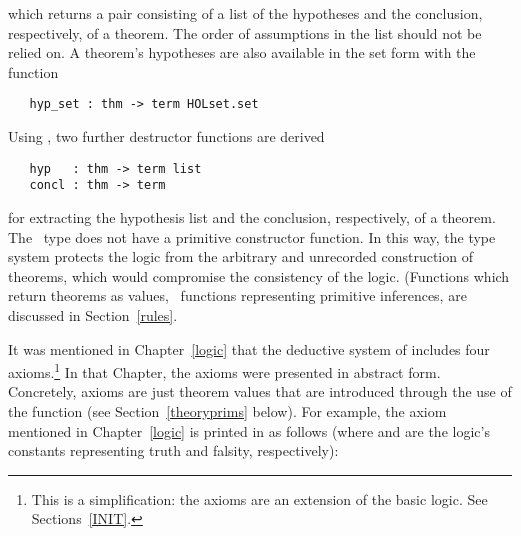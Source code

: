 \noindent which returns a pair consisting of a list of the
hypotheses
and the conclusion,
%
respectively, of a theorem.  The order of assumptions in the list
should not be relied on.  A theorem's hypotheses are also available in
the set form with the function

\begin{boxed}
\begin{verbatim}
   hyp_set : thm -> term HOLset.set
\end{verbatim}
\end{boxed}

Using , two further destructor
functions are derived

\begin{boxed}
\begin{verbatim}
   hyp   : thm -> term list
   concl : thm -> term
\end{verbatim}
\end{boxed}

\noindent for extracting the hypothesis list and the conclusion, respectively,
of a theorem. The \ML\ type  does not have
a primitive constructor function.  In this way, the \ML{} type system protects
the \HOL{} logic
from the arbitrary and unrecorded construction
of theorems, which would compromise
the consistency
 of the logic.
(Functions which return theorems as values, \eg\ functions representing primitive inferences,
are discussed in Section~\ref{rules}.

It was mentioned in Chapter~\ref{logic} that the deductive system of
\HOL{} includes four axioms.\footnote{This is a simplification: the
  axioms are an extension of the basic logic. See
  Sections~\ref{INIT}.}  In that Chapter, the axioms were presented in
abstract form.  Concretely, axioms are just theorem values that are
introduced through the use of the \ML{} function  (see
Section~\ref{theoryprims} below).  For example, the axiom
 mentioned in Chapter~\ref{logic} is printed in
\HOL{} as follows (where  and  are the \HOL{} logic's
constants representing truth and falsity, respectively):

